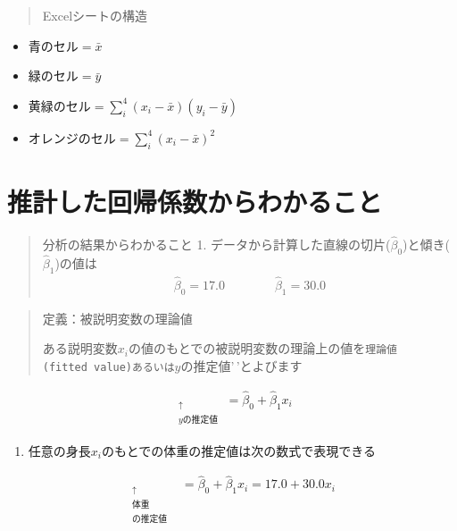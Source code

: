 \documentclass[
]{book}
\providecommand{\tightlist}{%
  \setlength{\itemsep}{0pt}\setlength{\parskip}{0pt}}
\theoremstyle{definition}
\theoremstyle{definition}
\theoremstyle{definition}
\theoremstyle{definition}
\theoremstyle{remark}
\begin{document}
\begin{quote}
Excelシートの構造
\end{quote}

\begin{itemize}
\tightlist
\item
  青のセル\(=\bar{x}\)
\item
  緑のセル\(=\bar{y}\)
\item
  黄緑のセル\(=\sum_{i}^{4} (x_i-\bar{x})(y_i-\bar{y})\)
\item
  オレンジのセル\(=\sum_{i}^{4} (x_i-\bar{x})^2\)
\end{itemize}

\hypertarget{ux63a8ux8a08ux3057ux305fux56deux5e30ux4fc2ux6570ux304bux3089ux308fux304bux308bux3053ux3068}{%
\section{推計した回帰係数からわかること}\label{ux63a8ux8a08ux3057ux305fux56deux5e30ux4fc2ux6570ux304bux3089ux308fux304bux308bux3053ux3068}}

\begin{quote}
分析の結果からわかること
1. データから計算した直線の切片(\(\hat\beta_0\))と傾き(\(\hat\beta_1\))の値は
\begin{align*}
\hat\beta_0=17.0\qquad \qquad
\hat\beta_1=30.0
\end{align*}
\end{quote}

\begin{quote}
定義：被説明変数の理論値

ある説明変数\(x_i\)の値のもとでの被説明変数の理論上の値を\texttt{理論値(fitted\ value)\textquotesingle{}\textquotesingle{}あるいは}\(y\)の推定値'\,'とよびます
\end{quote}

\begin{align*}
\mathop{\hat{y}_i}_{\substack{\uparrow \\ y\text{の推定値}}}=\hat\beta_0+\hat\beta_1 x_i
\end{align*}

\begin{enumerate}
\def\labelenumi{\arabic{enumi}.}
\setcounter{enumi}{1}
\tightlist
\item
  任意の身長\(x_i\)のもとでの体重の推定値は次の数式で表現できる
\end{enumerate}

\begin{align}
\mathop{\hat{y}_i}_{\substack{\uparrow \\ \text{体重} \\ \text{の推定値}}}
&=\hat\beta_0+\hat\beta_1 x_i
=17.0+30.0 x_i \label{steel_eq1}
\end{align}
\end{document}
